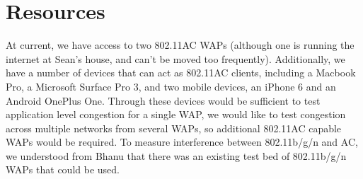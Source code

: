 \section{Resources}

At current, we have access to two 802.11AC WAPs (although one is running the
internet at Sean's house, and can't be moved too frequently). Additionally, we
have a number of devices that can act as 802.11AC clients, including a Macbook
Pro, a Microsoft Surface Pro 3, and two mobile devices, an iPhone 6 and an
Android OnePlus One. Through these devices would be sufficient to test
application level congestion for a single WAP, we would like to test congestion
across multiple networks from several WAPs, so additional 802.11AC capable WAPs
would be required. To measure interference between 802.11b/g/n and AC, we
understood from Bhanu that there was an existing test bed of 802.11b/g/n WAPs
that could be used.
